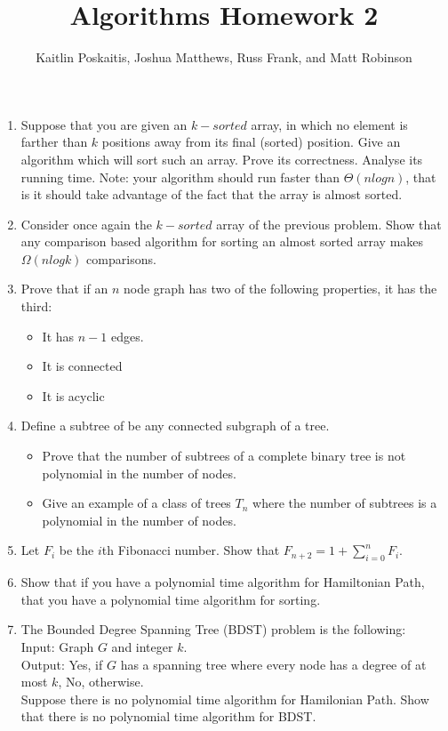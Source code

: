 \documentclass[12pt]{article}
\title{\bf Algorithms Homework 2}
\author{Kaitlin Poskaitis, Joshua Matthews, Russ Frank, and Matt Robinson}
\date{}
\begin{document}
\maketitle

\begin{enumerate}
\item Suppose that you are given an $k-sorted$ array, in which no element is
    farther than $k$ positions away from its final (sorted) position. Give an
    algorithm which will sort such an array. Prove its correctness. Analyse its
    running time. Note: your algorithm should run faster than $\Theta(nlogn)$,
    that is it should take advantage of the fact that the array is almost
    sorted.


\item Consider once again the $k-sorted$ array of the previous problem. Show
    that any comparison based algorithm for sorting an almost sorted array makes
    $\Omega(nlogk)$ comparisons.

\item Prove that if an $n$ node graph has two of the following properties, it has the
third:
\begin{itemize}
    \item It has $n-1$ edges.
    \item It is connected
    \item It is acyclic
\end{itemize}

\item Define a subtree of be any connected subgraph of a tree.
    \begin{itemize}
        \item Prove that the number of subtrees of a complete binary tree is not
            polynomial in the number of nodes.
        \item Give an example of a class of trees ${T_n}$ where the number of
            subtrees is a polynomial in the number of nodes.
    \end{itemize}

\item Let $F_i$ be the $i$th Fibonacci number. Show that $F_{n+2} = 1 +
    \sum_{i=0}^n F_i$.

\item Show that if you have a polynomial time algorithm for Hamiltonian Path,
    that you have a polynomial time algorithm for sorting.

\item The Bounded Degree Spanning Tree (BDST) problem is the following:\\
    Input: Graph $G$ and integer $k$.\\
    Output: Yes, if $G$ has a spanning tree where every node has a degree of at
    most $k$, No, otherwise.\\
    Suppose there is no polynomial time algorithm for Hamilonian Path. Show that
    there is no polynomial time algorithm for BDST.

\end{enumerate}
\end{document}
